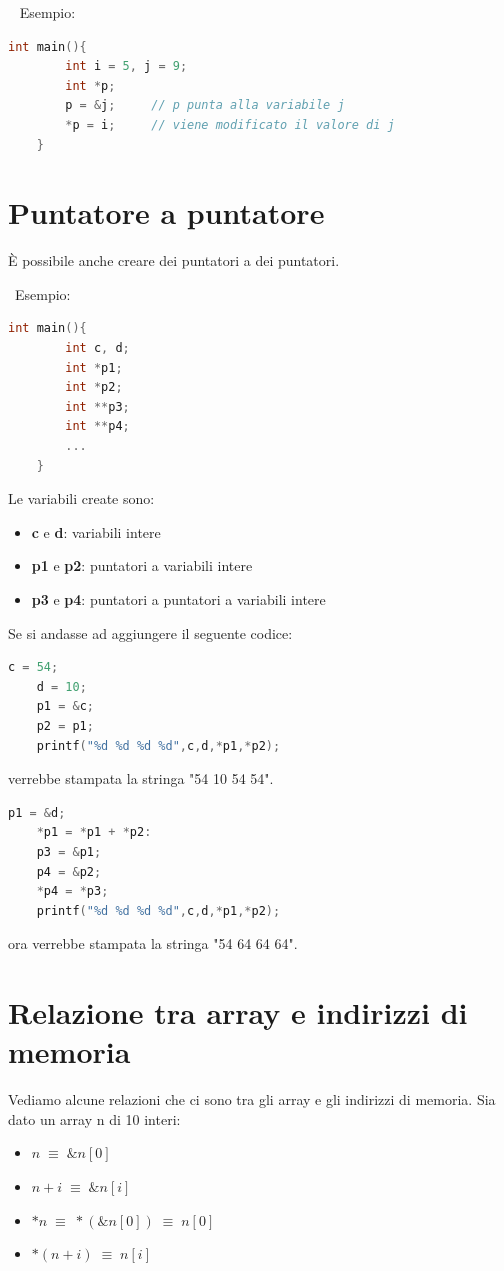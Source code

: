 \documentclass[a4paper,11pt,oneside]{book}
\begin{document}
~\newline
Esempio:
\begin{lstlisting}[language=C]
    int main(){
        int i = 5, j = 9;
        int *p;
        p = &j;     // p punta alla variabile j
        *p = i;     // viene modificato il valore di j
    }
\end{lstlisting}

\section{Puntatore a puntatore}
È possibile anche creare dei puntatori a dei puntatori.

~\newline Esempio:
\begin{lstlisting}[language=C]
    int main(){
        int c, d;
        int *p1;
        int *p2;
        int **p3;
        int **p4;
        ...
    }
\end{lstlisting}
Le variabili create sono:
\begin{itemize}
    \item \textbf{c} e \textbf{d}: variabili intere 
    \item \textbf{p1} e \textbf{p2}: puntatori a variabili intere 
    \item \textbf{p3} e \textbf{p4}: puntatori a puntatori a variabili intere
\end{itemize}
Se si andasse ad aggiungere il seguente codice:
\begin{lstlisting}[language=C]
    c = 54;
    d = 10;
    p1 = &c;
    p2 = p1;
    printf("%d %d %d %d",c,d,*p1,*p2);
\end{lstlisting}
verrebbe stampata la stringa "54 10 54 54".
\begin{lstlisting}[language=C]
    p1 = &d;
    *p1 = *p1 + *p2:
    p3 = &p1;
    p4 = &p2;
    *p4 = *p3;
    printf("%d %d %d %d",c,d,*p1,*p2);
\end{lstlisting}
ora verrebbe stampata la stringa "54 64 64 64".

\section{Relazione tra array e indirizzi di memoria}
Vediamo alcune relazioni che ci sono tra gli array e gli indirizzi di memoria.
Sia dato un array n di 10 interi:
\begin{itemize}
    \item $n \; \equiv \; \&n[0]$
    \item $n+i \; \equiv \; \&n[i]$
    \item $*n \; \equiv \; *(\&n[0]) \; \equiv \; n[0]$
    \item $*(n+i) \; \equiv \; n[i]$
\end{itemize}
\end{document}
